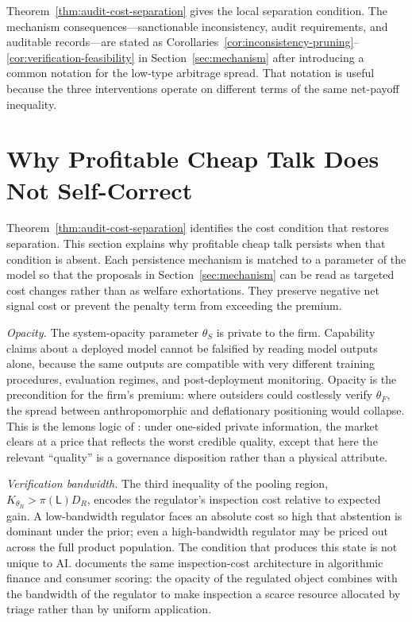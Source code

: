 \documentclass[review,authoryear]{elsarticle}
\theoremstyle{definition}
\theoremstyle{plain}
\begin{document}
Theorem~\ref{thm:audit-cost-separation} gives the local separation condition.
The mechanism consequences---sanctionable inconsistency, audit requirements,
and auditable records---are stated as
Corollaries~\ref{cor:inconsistency-pruning}--\ref{cor:verification-feasibility}
in Section~\ref{sec:mechanism} after introducing a common notation for
the low-type arbitrage spread.  That notation is useful because the three
interventions operate on different terms of the same net-payoff inequality.

\section{Why Profitable Cheap Talk Does Not Self-Correct}
\label{sec:persistence}

Theorem~\ref{thm:audit-cost-separation} identifies the cost condition that restores separation.  This section explains why profitable cheap talk persists when that condition is absent.  Each persistence mechanism is matched to a parameter of the model so that the proposals in Section~\ref{sec:mechanism} can be read as targeted cost changes rather than as welfare exhortations. They preserve negative net signal cost or prevent the penalty term from exceeding the premium.

\emph{Opacity.} The system-opacity parameter $\theta_S$ is private to the firm. Capability claims about a deployed model cannot be falsified by reading model outputs alone, because the same outputs are compatible with very different training procedures, evaluation regimes, and post-deployment monitoring. Opacity is the precondition for the firm's premium: where outsiders could costlessly verify $\theta_F$, the spread between anthropomorphic and deflationary positioning would collapse. This is the lemons logic of \citet{akerlof1970}: under one-sided private information, the market clears at a price that reflects the worst credible quality, except that here the relevant ``quality'' is a governance disposition rather than a physical attribute.

\emph{Verification bandwidth.} The third inequality of the pooling region, $K_{\theta_R}>\pi(\mathsf{L})D_R$, encodes the regulator's inspection cost relative to expected gain. A low-bandwidth regulator faces an absolute cost so high that abstention is dominant under the prior; even a high-bandwidth regulator may be priced out across the full product population. The condition that produces this state is not unique to AI. \citet{pasquale2015} documents the same inspection-cost architecture in algorithmic finance and consumer scoring: the opacity of the regulated object combines with the bandwidth of the regulator to make inspection a scarce resource allocated by triage rather than by uniform application.
\end{document}
